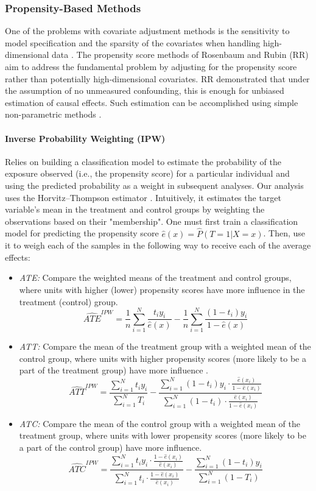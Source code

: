 \documentclass{article}
\begin{document}
\subsubsection{Propensity-Based Methods}

One of the problems with covariate adjustment methods is the sensitivity to model specification and the sparsity of the covariates when handling high-dimensional data \citep{zhao2020propensity}. The propensity score methods of Rosenbaum and Rubin (RR) aim to address the fundamental problem by adjusting for the propensity score rather than potentially high-dimensional covariates. RR demonstrated that under the assumption of no unmeasured confounding, this is enough for unbiased estimation of causal effects. Such estimation can be accomplished using simple non-parametric methods \citep{abdia2017propensity}.

\paragraph{Inverse Probability Weighting (IPW)} Relies on building a classification model to estimate the probability of the exposure observed (i.e., the propensity score) for a particular individual and using the predicted probability as a weight in subsequent analyses. Our analysis uses the Horvitz–Thompson estimator \citep{horvitz1952generalization}. Intuitively, it estimates the target variable's mean in the treatment and control groups by weighting the observations based on their "membership". One must first train a classification model for predicting the propensity score $\hat e(x) = \hat P(T=1 | X=x)$. Then, use it to weigh each of the samples in the following way to receive each of the average effects:

\begin{itemize}
    \item \textit{ATE:} Compare the weighted means of the treatment and control groups, where units with higher (lower) propensity scores have more influence in the treatment (control) group.
    \[
    \widehat{ATE}^{IPW} = \frac{1}{n}\sum_{i=1}^N \frac{t_i y_i}{\hat e(x)} - \frac{1}{n}\sum_{i=1}^N \frac{(1-t_i)y_i}{1-\hat e(x)}
    \]

    \item \textit{ATT:} Compare the mean of the treatment group with a weighted mean of the control group, where units with higher propensity scores (more likely to be a part of the treatment group) have more influence \citep{lechner2001identification}.
    \[
    \widehat{ATT}^{IPW} = \frac{\sum_{i=1}^N t_i y_i}{\sum_{i=1}^N T_i} - \frac{\sum_{i=1}^N (1-t_i)y_i \cdot \frac{\hat e(x_i)}{1- \hat e(x_i)}}{\sum_{i=1}^N (1-t_i) \cdot \frac{\hat e(x_i)}{1-\hat e(x_i)}}
    \]
    \item \textit{ATC:} Compare the mean of the control group with a weighted mean of the treatment group, where units with lower propensity scores (more likely to be a part of the control group) have more influence.
    \[
    \widehat{ATC}^{IPW} = \frac{\sum_{i=1}^N t_iy_i \cdot \frac{1-\hat e(x_i)}{\hat e(x_i)}}{\sum_{i=1}^N t_i \cdot \frac{1-\hat e(x_i)}{\hat e(x_i)}} - \frac{\sum_{i=1}^N (1-t_i)y_i}{\sum_{i=1}^N (1-T_i)}
    \]
\end{itemize}
\end{document}
